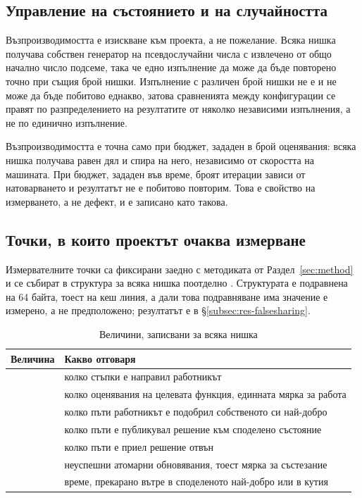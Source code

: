 \subsection{Управление на състоянието и на случайността}
\label{subsec:design-state}

Възпроизводимостта е изискване към проекта, а не пожелание. Всяка нишка получава
собствен генератор на псевдослучайни числа с извлечено от общо начално число подсеме,
така че едно изпълнение да може да бъде повторено точно при същия брой нишки.
Изпълнение с различен брой нишки не е и не може да бъде побитово еднакво, затова
сравненията между конфигурации се правят по разпределението на резултатите от няколко
независими изпълнения, а не по единично изпълнение.

Възпроизводимостта е точна само при бюджет, зададен в брой оценявания: всяка нишка
получава равен дял и спира на него, независимо от скоростта на машината. При бюджет,
зададен във време, броят итерации зависи от натоварването и резултатът не е побитово
повторим. Това е свойство на измерването, а не дефект, и е записано като такова.

\subsection{Точки, в които проектът очаква измерване}
\label{subsec:design-instrumented}

Измервателните точки са фиксирани заедно с методиката от Раздел~\ref{sec:method} и се
събират в структура за всяка нишка поотделно
. Структурата е подравнена на 64 байта, тоест на
кеш линия, а дали това подравняване има значение е измерено, а не предположено;
резултатът е в §\ref{subsec:res-falsesharing}.

\begin{table}[H]
\centering
\caption{Величини, записвани за всяка нишка}
\label{tab:instrumentation}
\begin{adjustbox}{max width=\textwidth}
\begin{tabular}{@{}L{4.2cm}L{9.6cm}@{}}
\toprule
\textbf{Величина} & \textbf{Какво отговаря} \\
\midrule
{} & колко стъпки е направил работникът \\
 & колко оценявания на целевата функция, единната мярка за работа \\
 & колко пъти работникът е подобрил собственото си най-добро \\
 & колко пъти е публикувал решение към споделено състояние \\
 & колко пъти е приел решение отвън \\
 & неуспешни атомарни обновявания, тоест мярка за състезание \\
 & време, прекарано вътре в споделеното най-добро или в кутия \\
\bottomrule
\end{tabular}
\end{adjustbox}
\end{table}
